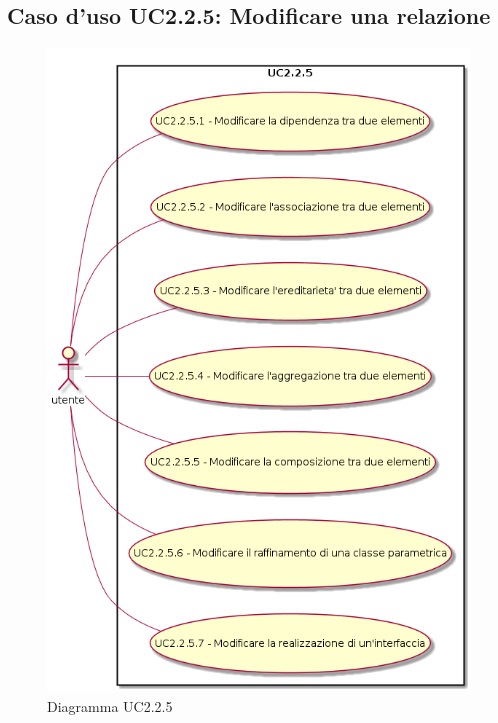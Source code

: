 \documentclass[../AnalisiDeiRequisiti.tex]{subfiles}
\begin{document}
			\subsection{Caso d'uso UC2.2.5: Modificare una relazione}
			\begin{figure} [H]
				\centering
				\includegraphics[scale=0.45]{./Figures/UC2.2.5.png}
				\caption{Diagramma UC2.2.5}\label{}
			\end{figure}
\end{document}
